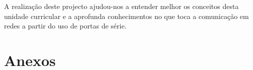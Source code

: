 \documentclass[11pt]{article}
\begin{document}
A realização deste projecto ajudou-nos a entender melhor os conceitos desta unidade curricular e a aprofunda conhecimentos no que toca a comunicação em redes a partir do uso de portas de série. 



\newpage
\section{Anexos}



\end{document}
